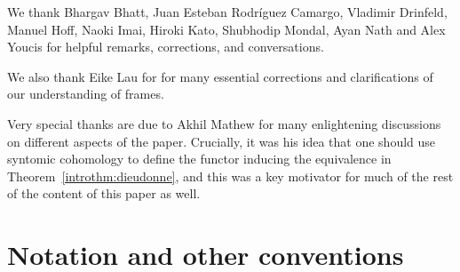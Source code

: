 \documentclass[10pt]{amsart}
\begin{document}
We thank Bhargav Bhatt, Juan Esteban Rodr\'iguez Camargo, Vladimir Drinfeld, Manuel Hoff, Naoki Imai, Hiroki Kato, Shubhodip Mondal, Ayan Nath and Alex Youcis for helpful remarks, corrections, and conversations.

We also thank Eike Lau for for many essential corrections and clarifications of our understanding of frames.

Very special thanks are due to Akhil Mathew for many enlightening discussions on different aspects of the paper. Crucially, it was his idea that one should use syntomic cohomology to define the functor inducing the equivalence in Theorem~\ref{introthm:dieudonne}, and this was a key motivator for much of the rest of the content of this paper as well. 

\section{Notation and other conventions}
\label{sec:notation}
\end{document}
